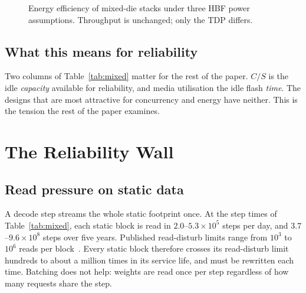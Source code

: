 \documentclass[conference,10pt]{IEEEtran}
\newcommand{\Hthree}{H\textsuperscript{3}}
\begin{document}
\begin{figure}[t]
\centering
{}
\caption{Energy efficiency of mixed-die stacks under three HBF power
assumptions. Throughput is unchanged; only the TDP differs.}
\label{fig:power}
\end{figure}

\subsection{What this means for reliability}
Two columns of Table~\ref{tab:mixed} matter for the rest of the paper. $C/S$ is the
idle \emph{capacity} available for reliability, and media utilisation the idle
flash \emph{time}. The designs that are most attractive for concurrency and energy
have neither. This is the tension the rest of the paper examines.

\section{The Reliability Wall}
\label{sec:wall}

\subsection{Read pressure on static data}
A decode step streams the whole static footprint once. At the step times of
Table~\ref{tab:mixed}, each static block is read in $2.0$--$5.3\times10^{5}$
steps per day, and $3.7$--$9.6\times10^{8}$ steps over five years. Published
read-disturb limits range from $10^{3}$ to $10^{6}$ reads per
block~\cite{sun2025lincoln,oliveira2026flint}. Every static block therefore
crosses its read-disturb limit hundreds to about a million times in its service
life, and must be rewritten each time. Batching does not help: weights are read
once per step regardless of how many requests share the step.
\end{document}
